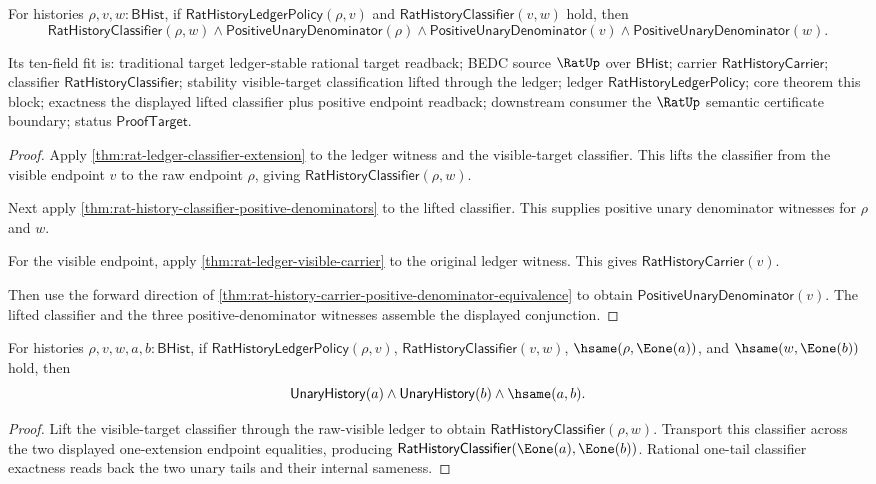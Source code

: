 \begin{theorem}
\label{thm:rat-ledger-visible-target-lift-positive-endpoints}
For histories $\rho,v,w:\mathsf{BHist}$, if
$\mathsf{RatHistoryLedgerPolicy}(\rho,v)$ and
$\mathsf{RatHistoryClassifier}(v,w)$ hold, then
$$
\mathsf{RatHistoryClassifier}(\rho,w)
\land \mathsf{PositiveUnaryDenominator}(\rho)
\land \mathsf{PositiveUnaryDenominator}(v)
\land \mathsf{PositiveUnaryDenominator}(w).
$$

Its ten-field fit is: traditional target ledger-stable rational target
readback; BEDC source $\RatUp$ over $\mathsf{BHist}$; carrier
$\mathsf{RatHistoryCarrier}$; classifier $\mathsf{RatHistoryClassifier}$;
stability visible-target classification lifted through the ledger; ledger
$\mathsf{RatHistoryLedgerPolicy}$; core theorem this block; exactness the
displayed lifted classifier plus positive endpoint readback; downstream
consumer the $\RatUp$ semantic certificate boundary; status
$\mathsf{ProofTarget}$.
\end{theorem}
\begin{proof}
Apply \autoref{thm:rat-ledger-classifier-extension} to the ledger witness and
the visible-target classifier. This lifts the classifier from the visible
endpoint $v$ to the raw endpoint $\rho$, giving
$\mathsf{RatHistoryClassifier}(\rho,w)$.

Next apply \autoref{thm:rat-history-classifier-positive-denominators} to the
lifted classifier. This supplies positive unary denominator witnesses for
$\rho$ and $w$.

For the visible endpoint, apply
\autoref{thm:rat-ledger-visible-carrier} to the original ledger witness. This
gives $\mathsf{RatHistoryCarrier}(v)$.

Then use the forward direction of
\autoref{thm:rat-history-carrier-positive-denominator-equivalence} to obtain
$\mathsf{PositiveUnaryDenominator}(v)$. The lifted classifier and the three
positive-denominator witnesses assemble the displayed conjunction.
\end{proof}

\begin{theorem}
\label{thm:rat-ledger-visible-target-e1-pair-readback}
For histories $\rho,v,w,a,b:\mathsf{BHist}$, if
$\mathsf{RatHistoryLedgerPolicy}(\rho,v)$,
$\mathsf{RatHistoryClassifier}(v,w)$,
$\hsame(\rho,\Eone(a))$, and $\hsame(w,\Eone(b))$ hold, then
$$
\mathsf{UnaryHistory}(a)\land \mathsf{UnaryHistory}(b)\land \hsame(a,b).
$$
\end{theorem}
\begin{proof}
Lift the visible-target classifier through the raw-visible ledger to obtain
$\mathsf{RatHistoryClassifier}(\rho,w)$. Transport this classifier across the
two displayed one-extension endpoint equalities, producing
$\mathsf{RatHistoryClassifier}(\Eone(a),\Eone(b))$. Rational one-tail
classifier exactness reads back the two unary tails and their internal
sameness.
\end{proof}

